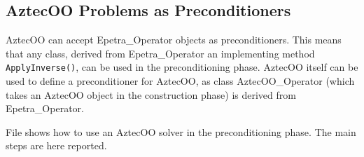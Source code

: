 
\subsection{AztecOO Problems as Preconditioners}
\label{sec:prec_aztecoo}

AztecOO can accept Epetra\_Operator objects as preconditioners. This
means that any class, derived from Epetra\_Operator an implementing
method \verb!ApplyInverse()!, can be used in the preconditioning
phase. AztecOO itself can be used to define a preconditioner for
AztecOO, as class AztecOO\_Operator (which takes an AztecOO object in
the construction phase) is derived from Epetra\_Operator.

File  shows how to use an AztecOO solver in the
preconditioning phase.  The main steps are here reported.

